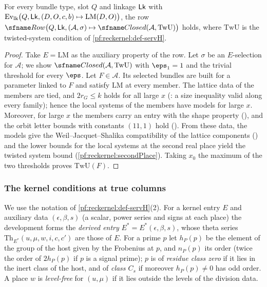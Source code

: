 \begin{theorem}\label{pf:reckernel:rowTwU}
For every bundle type, slot $Q$ and linkage $\mathsf{Lk}$ with
$\mathrm{Ev}_{\mathrm{lk}}\bigl(Q,\mathsf{Lk},(D,O,c,b)\mapsto\mathrm{LM}(D,O)\bigr)$, the row
$\reckRow\bigl(Q,\reckLk,(\mathcal A,\sigma)\mapsto\reckClosed(\mathcal A,\mathrm{TwU})\bigr)$ holds, where $\mathrm{TwU}$ is
the twisted-system condition of \cref{pf:reckernel:def-servH}.
\end{theorem}

\begin{proof}
Take $E=\mathrm{LM}$ as the auxiliary property of the row. Let $\sigma$ be an $E$-selection for $\mathcal A$; we show
$\reckClosed(\mathcal A,\mathrm{TwU})$ with $\eps_1=1$ and the trivial threshold for every $\eps$. Let $F\in\mathcal A$. Its
selected bundles are built for a parameter linked to $F$ and satisfy $\mathrm{LM}$ at every member. The lattice data of the
members are tied, and $2r_G\le k$ holds for all large $x$
(: a size inequality valid along every family); hence the local systems
of the members have models for large $x$. Moreover, for large $x$ the members carry an entry with the shape property
(), and the orbit letter bounds with constants $(11,1)$ hold
(). From these data, the
models give the Weil--Jacquet--Shalika compatibility of the lattice components
() and the lower bounds for the local systems at the
second real place yield the twisted system bound
(\cref{pf:reckernel:secondPlace}). Taking $x_0$ the maximum of the two
thresholds proves $\mathrm{TwU}(F)$.
\end{proof}

\subsubsection{The kernel conditions at true columns}\label{pf:reckernel:sec-truecols}
We use the notation of \cref{pf:reckernel:def-servH}(2). For a kernel entry $E$ and auxiliary data $(\epsilon,\beta,s)$
(a scalar, power series and signs at each place) the development forms the \emph{derived entry}
$E^\ast=E^\ast(\epsilon,\beta,s)$, whose theta series $\mathrm{Th}_{E^\ast}(u,\mu,w,i,c,c')$ are those of $E$. For a prime $p$
let $h_P(p)$ be the element of the group of the host given by the Frobenius at $p$, and $n_P(p)$ its order (twice the
order of $2h_P(p)$ if $p$ is a signal prime); $p$ is of \emph{residue class zero} if it lies in the inert class of the host,
and of \emph{class $C_s$} if moreover $h_P(p)\ne0$ has odd order. A place $w$ is \emph{level-free} for $(u,\mu)$ if it lies
outside the levels of the division data.

